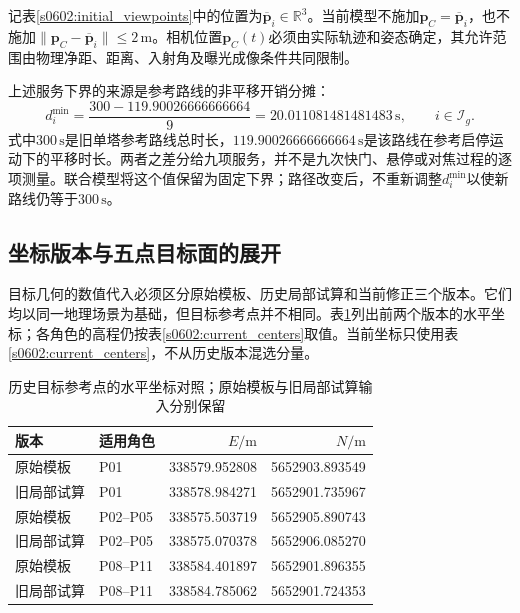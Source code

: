记表\ref{s0602:initial_viewpoints}中的位置为$\overline{\mathbf p}_i\in\mathbb R^3$。当前模型不施加$\mathbf p_C=\overline{\mathbf p}_i$，也不施加$\|\mathbf p_C-\overline{\mathbf p}_i\|\le2\,\mathrm m$。相机位置$\mathbf p_C(t)$必须由实际轨迹和姿态确定，其允许范围由物理净距、距离、入射角及曝光成像条件共同限制。

上述服务下界的来源是参考路线的非平移开销分摊：
\begin{equation}
 d_i^{\min}
 =\frac{300-119.90026666666664}{9}
 =20.011081481481483\,\mathrm s,
 \qquad i\in\mathcal I_g.
 \label{s0602:service_value}
\end{equation}
式中$300\,\mathrm s$是旧单塔参考路线总时长，$119.90026666666664\,\mathrm s$是该路线在参考启停运动下的平移时长。两者之差分给九项服务，并不是九次快门、悬停或对焦过程的逐项测量。联合模型将这个值保留为固定下界；路径改变后，不重新调整$d_i^{\min}$以使新路线仍等于$300\,\mathrm s$。

\subsection{坐标版本与五点目标面的展开}

目标几何的数值代入必须区分原始模板、历史局部试算和当前修正三个版本。它们均以同一地理场景为基础，但目标参考点并不相同。表\ref{s0602:historical_centers}列出前两个版本的水平坐标；各角色的高程仍按表\ref{s0602:current_centers}取值。当前坐标只使用表\ref{s0602:current_centers}，不从历史版本混选分量。

\begin{table}[htbp]
\centering\small
\caption{历史目标参考点的水平坐标对照；原始模板与旧局部试算输入分别保留}
\label{s0602:historical_centers}
\begin{tabular}{@{}llrr@{}}
\toprule
版本 & 适用角色 & $E/\mathrm m$ & $N/\mathrm m$\\
\midrule
原始模板 & P01 & 338579.952808 & 5652903.893549\\
旧局部试算 & P01 & 338578.984271 & 5652901.735967\\
原始模板 & P02--P05 & 338575.503719 & 5652905.890743\\
旧局部试算 & P02--P05 & 338575.070378 & 5652906.085270\\
原始模板 & P08--P11 & 338584.401897 & 5652901.896355\\
旧局部试算 & P08--P11 & 338584.785062 & 5652901.724353\\
\bottomrule
\end{tabular}
\end{table}

